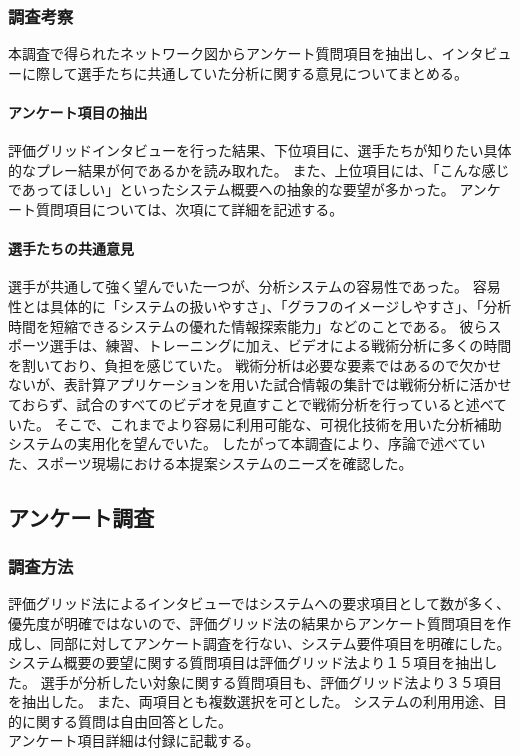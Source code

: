 \documentclass[sotsuron]{kuee}
\begin{document}
			\subsubsection{調査考察}
				本調査で得られたネットワーク図からアンケート質問項目を抽出し、インタビューに際して選手たちに共通していた分析に関する意見についてまとめる。
				\paragraph{アンケート項目の抽出}
					評価グリッドインタビューを行った結果、下位項目に、選手たちが知りたい具体的なプレー結果が何であるかを読み取れた。
					また、上位項目には、「こんな感じであってほしい」といったシステム概要への抽象的な要望が多かった。
					アンケート質問項目については、次項にて詳細を記述する。
				\paragraph{選手たちの共通意見}
					選手が共通して強く望んでいた一つが、分析システムの容易性であった。
					容易性とは具体的に「システムの扱いやすさ」、「グラフのイメージしやすさ」、「分析時間を短縮できるシステムの優れた情報探索能力」などのことである。
					彼らスポーツ選手は、練習、トレーニングに加え、ビデオによる戦術分析に多くの時間を割いており、負担を感じていた。
					戦術分析は必要な要素ではあるので欠かせないが、表計算アプリケーションを用いた試合情報の集計では戦術分析に活かせておらず、試合のすべてのビデオを見直すことで戦術分析を行っていると述べていた。
					そこで、これまでより容易に利用可能な、可視化技術を用いた分析補助システムの実用化を望んでいた。
					したがって本調査により、序論で述べていた、スポーツ現場における本提案システムのニーズを確認した。
		\subsection{アンケート調査}
			\subsubsection{調査方法}
				評価グリッド法によるインタビューではシステムへの要求項目として数が多く、優先度が明確ではないので、評価グリッド法の結果からアンケート質問項目を作成し、同部に対してアンケート調査を行ない、システム要件項目を明確にした。
				\\システム概要の要望に関する質問項目は評価グリッド法より１５項目を抽出した。
				選手が分析したい対象に関する質問項目も、評価グリッド法より３５項目を抽出した。
				また、両項目とも複数選択を可とした。
				システムの利用用途、目的に関する質問は自由回答とした。
				\\アンケート項目詳細は付録に記載する。
\end{document}
